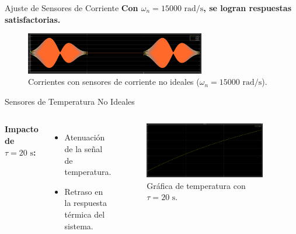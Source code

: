\documentclass[12pt]{beamer}
\begin{document}
\begin{frame}{Ajuste de Sensores de Corriente}
    \textbf{Con \(\omega_n = 15000 \text{ rad/s}\), se logran respuestas satisfactorias.}
    \begin{figure}
        \centering
        \includegraphics[width=0.7\textwidth]{Imagenes/9_corNI_15000_c.png}
        \caption{Corrientes con sensores de corriente no ideales (\(\omega_n = 15000 \text{ rad/s}\)).}
    \end{figure}
\end{frame}

\begin{frame}{Sensores de Temperatura No Ideales}
    \begin{columns}
        \textbf{Impacto de \(\tau = 20 \text{ s}\):}
        \begin{itemize}
            \item Atenuación de la señal de temperatura.
            \item Retraso en la respuesta térmica del sistema.
        \end{itemize}

        \begin{figure}
            \centering
            \includegraphics[width=0.9\textwidth]{Imagenes/11_temNI_20.png}
            \caption{Gráfica de temperatura con \(\tau = 20 \text{ s}\).}
        \end{figure}
    \end{columns}
\end{frame}
\end{document}
